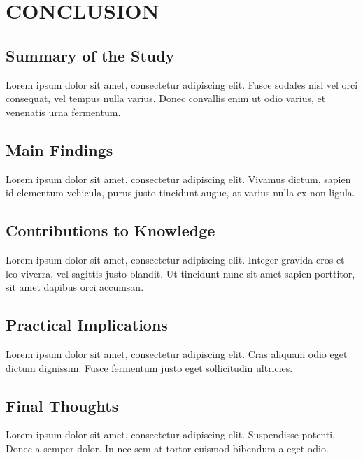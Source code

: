 \chapter{CONCLUSION}
\section{Summary of the Study}
Lorem ipsum dolor sit amet, consectetur adipiscing elit. Fusce sodales nisl vel orci consequat, vel tempus nulla varius. Donec convallis enim ut odio varius, et venenatis urna fermentum.

\section{Main Findings}
Lorem ipsum dolor sit amet, consectetur adipiscing elit. Vivamus dictum, sapien id elementum vehicula, purus justo tincidunt augue, at varius nulla ex non ligula.

\section{Contributions to Knowledge}
Lorem ipsum dolor sit amet, consectetur adipiscing elit. Integer gravida eros et leo viverra, vel sagittis justo blandit. Ut tincidunt nunc sit amet sapien porttitor, sit amet dapibus orci accumsan.

\section{Practical Implications}
Lorem ipsum dolor sit amet, consectetur adipiscing elit. Cras aliquam odio eget dictum dignissim. Fusce fermentum justo eget sollicitudin ultricies.

\section{Final Thoughts}
Lorem ipsum dolor sit amet, consectetur adipiscing elit. Suspendisse potenti. Donec a semper dolor. In nec sem at tortor euismod bibendum a eget odio.